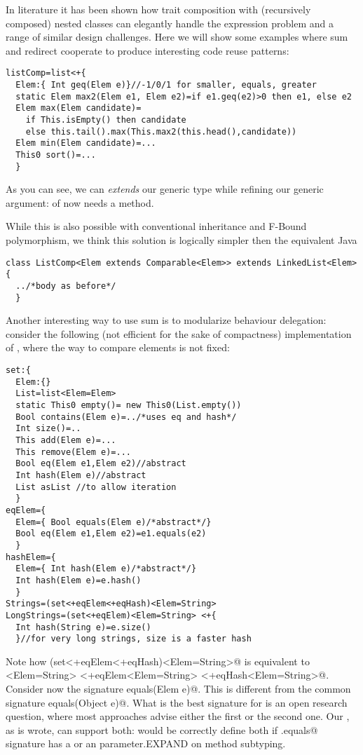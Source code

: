 In literature it has been shown how trait composition with (recursively composed) nested classes can 
elegantly handle the expression problem and a range of similar design challenges.
Here we will show some examples where sum and redirect cooperate to produce interesting code reuse patterns:

\begin{lstlisting}
listComp=list<+{
  Elem:{ Int geq(Elem e)}//-1/0/1 for smaller, equals, greater
  static Elem max2(Elem e1, Elem e2)=if e1.geq(e2)>0 then e1, else e2
  Elem max(Elem candidate)=
    if This.isEmpty() then candidate
    else this.tail().max(This.max2(this.head(),candidate))
  Elem min(Elem candidate)=...
  This0 sort()=...
  }
\end{lstlisting}
As you can see, we can \emph{extends} our generic type while refining our generic argument:
\Q@Elem@ of \Q@listComp@ now needs a \Q@geq@ method.

While this is also possible with conventional inheritance and F-Bound polymorphism, we think this solution is logically simpler then the equivalent Java
\begin{lstlisting}
class ListComp<Elem extends Comparable<Elem>> extends LinkedList<Elem>{
  ../*body as before*/
  }
\end{lstlisting}

Another interesting way to use sum is to modularize behaviour delegation: consider the following
(not efficient for the sake of compactness) implementation of \Q@set@, where the way to compare elements is not fixed:
\begin{lstlisting}
set:{
  Elem:{}
  List=list<Elem=Elem>
  static This0 empty()= new This0(List.empty())
  Bool contains(Elem e)=../*uses eq and hash*/
  Int size()=..
  This add(Elem e)=...
  This remove(Elem e)=...
  Bool eq(Elem e1,Elem e2)//abstract
  Int hash(Elem e)//abstract
  List asList //to allow iteration
  }
eqElem={
  Elem={ Bool equals(Elem e)/*abstract*/}
  Bool eq(Elem e1,Elem e2)=e1.equals(e2)
  }
hashElem={
  Elem={ Int hash(Elem e)/*abstract*/}
  Int hash(Elem e)=e.hash()
  }
Strings=(set<+eqElem<+eqHash)<Elem=String>
LongStrings=(set<+eqElem)<Elem=String> <+{
  Int hash(String e)=e.size()
  }//for very long strings, size is a faster hash
\end{lstlisting}
Note how 
\Q@(set<+eqElem<+eqHash)<Elem=String>@
is equivalent to \Q@set<Elem=String> <+eqElem<Elem=String> <+eqHash<Elem=String>@.
Consider now the signature \Q@Bool equals(Elem e)@.
This is different from the common signature \Q@Bool equals(Object e)@. What is the best
signature for \Q@equals@ is an open research question, where most approaches advise either the
first or the second one. Our \Q@eqElem@, as is wrote, can support both:
\Q@Strings@ would be correctly define both if \Q@String.equals@ signature
has a \Q@String@ or an \Q@Object@ parameter.EXPAND on method subtyping.



